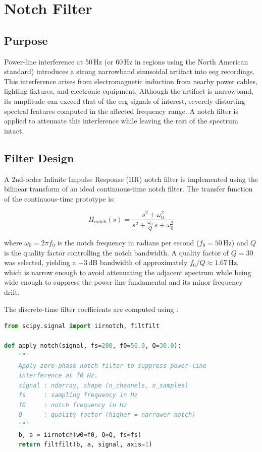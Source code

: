 \section{Notch Filter}
\label{sec:sp_notch}

\subsection{Purpose}

Power-line interference at 50\,Hz (or 60\,Hz in regions using
the North American standard) introduces a strong narrowband
sinusoidal artifact into \acrshort{eeg} recordings. This
interference arises from electromagnetic induction from nearby
power cables, lighting fixtures, and electronic equipment.
Although the artifact is narrowband, its amplitude can exceed
that of the \acrshort{eeg} signals of interest, severely
distorting spectral features computed in the affected frequency
range. A notch filter is applied to attenuate this interference
while leaving the rest of the spectrum intact.

\subsection{Filter Design}

A 2nd-order Infinite Impulse Response (IIR) notch filter
is implemented using the bilinear transform of an ideal
continuous-time notch filter. The transfer function of the
continuous-time prototype is:

\begin{equation}
H_{\text{notch}}(s) = \frac{s^2 + \omega_0^2}
{s^2 + \frac{\omega_0}{Q}\,s + \omega_0^2}
\label{eq:notch_ct}
\end{equation}

\noindent where $\omega_0 = 2\pi f_0$ is the notch frequency
in radians per second ($f_0 = 50$\,Hz) and $Q$ is the quality
factor controlling the notch bandwidth. A quality factor of
$Q = 30$ was selected, yielding a $-3$\,dB bandwidth of
approximately $f_0/Q \approx 1.67$\,Hz, which is narrow enough
to avoid attenuating the adjacent spectrum while being wide
enough to suppress the power-line fundamental and its minor
frequency drift.

The discrete-time filter coefficients are computed using
:

\begin{lstlisting}[language=Python,
    caption={Notch filter implementation.},
    label={lst:notch}]
from scipy.signal import iirnotch, filtfilt

def apply_notch(signal, fs=200, f0=50.0, Q=30.0):
    """
    Apply zero-phase notch filter to suppress power-line
    interference at f0 Hz.
    signal : ndarray, shape (n_channels, n_samples)
    fs     : sampling frequency in Hz
    f0     : notch frequency in Hz
    Q      : quality factor (higher = narrower notch)
    """
    b, a = iirnotch(w0=f0, Q=Q, fs=fs)
    return filtfilt(b, a, signal, axis=1)
\end{lstlisting}

